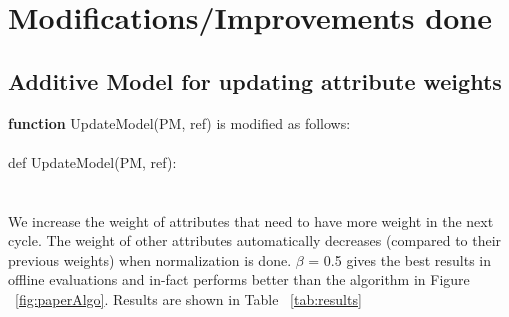 \documentclass[10pt]{article}
\begin{document}
\section{Modifications/Improvements done}
\subsection{Additive Model for updating attribute weights}
\label{sec:first}
\textbf{function} UpdateModel(PM, ref) is modified as follows:\\
\\
def UpdateModel(PM, ref):\\
\noindent{}
\\
\\
We increase the weight of attributes that need to have more weight in the next cycle. The weight of other attributes automatically decreases (compared to their previous weights) when normalization is done.
$\beta$ = 0.5 gives the best results in offline evaluations and in-fact performs better than the 
algorithm in Figure ~\ref{fig:paperAlgo}. Results are shown in Table ~\ref{tab:results}

\end{document}
